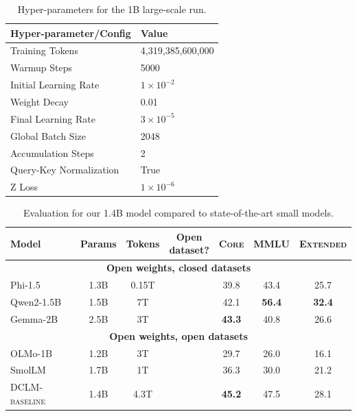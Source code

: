 \documentclass{article}
\newcommand{\cmark}{\ding{51}}
\newcommand{\xmark}{\ding{55}}
\newcommand{\hqpool}{\textsc{DCLM-baseline}\xspace}
\newcommand{\lowvar}{\textsc{Core}\xspace}
\newcommand{\aggscore}{\textsc{Extended}\xspace}
\begin{document}
\begin{table}[t]
    \centering
    \caption{Hyper-parameters for the 1B large-scale run.}
    \begin{tabular}{ll}
        \toprule
        Hyper-parameter/Config & Value \\
        \midrule
        Training Tokens &  4,319,385,600,000  \\
        Warmup Steps & 5000 \\
        Initial Learning Rate & $1\times 10^{-2}$ \\
        Weight Decay & 0.01 \\
        Final Learning Rate  & $3 \times 10^{-5}$ \\
        Global Batch Size & 2048 \\
        Accumulation Steps & 2 \\
        Query-Key Normalization & True \\
        Z Loss & $1 \times 10^{-6}$ \\
        \bottomrule
    \end{tabular}

    \label{tab:hyperparameters-1b}
\end{table}

\begin{table}[t]
\centering
\caption{Evaluation for our 1.4B model compared to state-of-the-art small models.}
\begin{tabular}{lcccccc}
\toprule
Model & Params & Tokens & \makecell{Open \\ dataset?} & \lowvar & MMLU & \aggscore \\
\midrule
\multicolumn{7}{c}{\textbf{Open weights, closed datasets}} \\\midrule
Phi-1.5 & 1.3B & 0.15T & \xmark & 39.8 & 43.4 & 25.7 \\
Qwen2-1.5B & 1.5B & 7T & \xmark & 42.1 & \textbf{56.4} & \textbf{32.4} \\
Gemma-2B & 2.5B & 3T & \xmark & \textbf{43.3} & 40.8 & 26.6 \\\midrule
\multicolumn{7}{c}{\textbf{Open weights, open datasets}} \\\midrule
OLMo-1B & 1.2B & 3T & \cmark & 29.7 & 26.0 & 16.1 \\
SmolLM & 1.7B & 1T & \cmark & 36.3 & 30.0 & 21.2 \\
\hqpool & 1.4B & 4.3T & \cmark & \textbf{45.2} & 47.5 & 28.1 \\\bottomrule
\end{tabular}
\label{tab:hero-1b-results}
\end{table}
\end{document}
